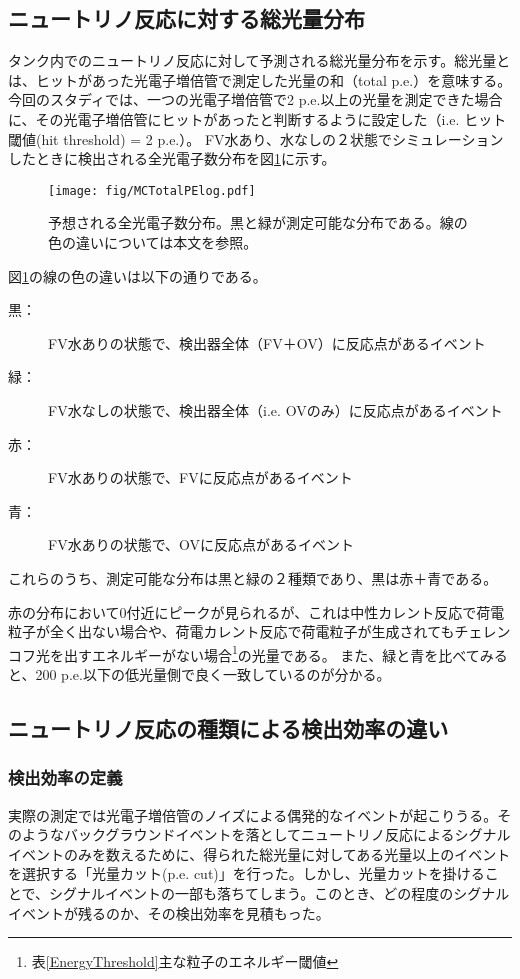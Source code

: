 \documentclass[11pt]{jreport}
\newcommand{\figref}[1]{図\ref{#1}}
\newcommand{\tabref}[1]{表\ref{#1}}
\begin{document}
\subsection{ニュートリノ反応に対する総光量分布}
タンク内でのニュートリノ反応に対して予測される総光量分布を示す。総光量とは、ヒットがあった光電子増倍管で測定した光量の和（total p.e.）を意味する。今回のスタディでは、一つの光電子増倍管で2 p.e.以上の光量を測定できた場合に、その光電子増倍管にヒットがあったと判断するように設定した（i.e. ヒット閾値(hit threshold) = 2 p.e.）。
FV水あり、水なしの２状態でシミュレーションしたときに検出される全光電子数分布を\figref{MCTotalPElog}に示す。

\begin{figure}[htbp]
\centering
\texttt{[image: fig/MCTotalPElog.pdf]}
\caption[予想される全光電子数分布]{予想される全光電子数分布。黒と緑が測定可能な分布である。線の色の違いについては本文を参照。}
\label{MCTotalPElog}
\end{figure}


\figref{MCTotalPElog}の線の色の違いは以下の通りである。

\begin{description}
\item [黒：] FV水ありの状態で、検出器全体（FV＋OV）に反応点があるイベント
\item [緑：] FV水なしの状態で、検出器全体（i.e. OVのみ）に反応点があるイベント
\item [赤：]  FV水ありの状態で、FVに反応点があるイベント
\item [青：]  FV水ありの状態で、OVに反応点があるイベント
\end{description}

これらのうち、測定可能な分布は黒と緑の２種類であり、黒は赤＋青である。

赤の分布において0付近にピークが見られるが、これは中性カレント反応で荷電粒子が全く出ない場合や、荷電カレント反応で荷電粒子が生成されてもチェレンコフ光を出すエネルギーがない場合\footnote{\tabref{EnergyThreshold}主な粒子のエネルギー閾値}の光量である。
また、緑と青を比べてみると、200 p.e.以下の低光量側で良く一致しているのが分かる。

\subsection{ニュートリノ反応の種類による検出効率の違い}
\subsubsection{検出効率の定義}
実際の測定では光電子増倍管のノイズによる偶発的なイベントが起こりうる。そのようなバックグラウンドイベントを落としてニュートリノ反応によるシグナルイベントのみを数えるために、得られた総光量に対してある光量以上のイベントを選択する「光量カット(p.e. cut)」を行った。しかし、光量カットを掛けることで、シグナルイベントの一部も落ちてしまう。このとき、どの程度のシグナルイベントが残るのか、その検出効率を見積もった。
\end{document}

